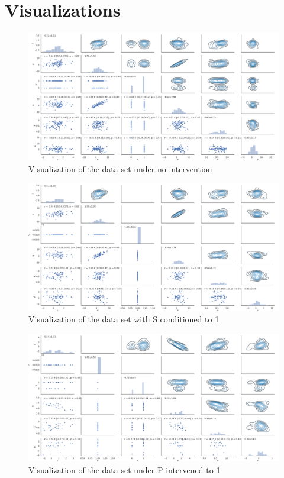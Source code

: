 \documentclass[12pt,fleqn,]{article}
\begin{document}
\newpage
\begin{thebibliography}{9}
	

	
	
	

\end{thebibliography}


\appendix
\section{Visualizations}
\begin{figure}[H]
	\centering
	\includegraphics[width=\linewidth]{interNonedata}
	\caption{Visualization of the data set under no intervention}
	\label{fig:interNonedata}
\end{figure}
\begin{figure}[H]
	\centering
	\includegraphics[width=\linewidth]{icondSdata}
	\caption{Visualization of the data set with S conditioned to 1}
	\label{fig:icondSdata}
\end{figure}
\begin{figure}[H]
	\centering
	\includegraphics[width=\linewidth]{interPdata}
	\caption{Visualization of the data set under P intervened to 1}
	\label{fig:interPdata}
\end{figure}
\end{document}
